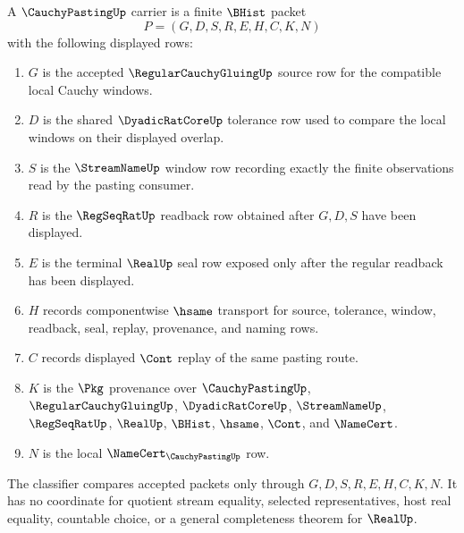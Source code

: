 \begin{definition}
\label{def:cauchy-pasting-carrier}
A $\CauchyPastingUp$ carrier is a finite $\BHist$ packet
$$
P=(G,D,S,R,E,H,C,K,N)
$$
with the following displayed rows:
\begin{enumerate}
\item $G$ is the accepted $\RegularCauchyGluingUp$ source row for the compatible local Cauchy windows.
\item $D$ is the shared $\DyadicRatCoreUp$ tolerance row used to compare the local windows on their displayed overlap.
\item $S$ is the $\StreamNameUp$ window row recording exactly the finite observations read by the pasting consumer.
\item $R$ is the $\RegSeqRatUp$ readback row obtained after $G,D,S$ have been displayed.
\item $E$ is the terminal $\RealUp$ seal row exposed only after the regular readback has been displayed.
\item $H$ records componentwise $\hsame$ transport for source, tolerance, window, readback, seal, replay, provenance, and naming rows.
\item $C$ records displayed $\Cont$ replay of the same pasting route.
\item $K$ is the $\Pkg$ provenance over $\CauchyPastingUp$, $\RegularCauchyGluingUp$, $\DyadicRatCoreUp$, $\StreamNameUp$, $\RegSeqRatUp$, $\RealUp$, $\BHist$, $\hsame$, $\Cont$, and $\NameCert$.
\item $N$ is the local $\NameCert_{\CauchyPastingUp}$ row.
\end{enumerate}
The classifier compares accepted packets only through $G,D,S,R,E,H,C,K,N$. It has no coordinate for quotient stream equality, selected representatives, host real equality, countable choice, or a general completeness theorem for $\RealUp$.
\end{definition}

